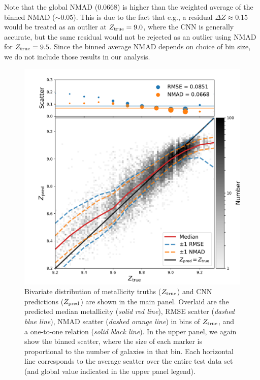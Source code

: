 \documentclass[fleqn,usenatbib]{mnras}
\begin{document}
Note that the global NMAD (0.0668) is higher than the weighted average of the binned NMAD ($\sim 0.05$).
This is due to the fact that e.g., a residual $\Delta Z \approx 0.15$ would be treated as an outlier at $Z_{\rm true} = 9.0$, where the CNN is generally accurate, but the same residual would not be rejected as an outlier using NMAD for $Z_{\rm true} = 9.5$.
Since the binned average NMAD depends on choice of bin size, we do not include those results in our analysis.


\begin{figure}
	\includegraphics[width=\columnwidth]{02-prediction_128_summary.pdf}
	\caption{\label{fig:predicting-metallicity}
		Bivariate distribution of metallicity truths ($Z_{\rm true}$) and CNN predictions ($Z_{\rm pred}$) are shown in the main panel.
		Overlaid are the predicted median metallicity (\textit{solid red line}), RMSE scatter (\textit{dashed blue line}), NMAD scatter (\textit{dashed orange line}) in bins of $Z_{\rm true}$, and a one-to-one relation (\textit{solid black line}).
		In the upper panel, we again show the binned scatter, where the size of each marker is proportional to the number of galaxies in that bin.
		Each horizontal line corresponds to the average scatter over the entire test data set (and global value indicated in the upper panel legend).
		}
\end{figure}
\end{document}
